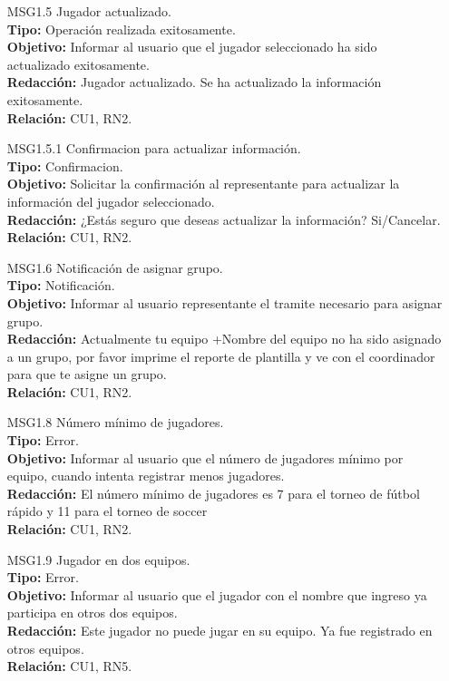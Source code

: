 \begin{itemize}
	 \item[MSG1.5] Jugador actualizado.\\
	 \textbf{Tipo:} Operación realizada exitosamente.\\
	 \textbf{Objetivo:} Informar al usuario que el jugador seleccionado ha sido actualizado exitosamente.\\
	 \textbf{Redacción:} Jugador actualizado. Se ha actualizado la información exitosamente. \\ 
	 \textbf{Relación:} CU1, RN2.
	 
	 \item[MSG1.5.1] Confirmacion para actualizar información.\\
	 \textbf{Tipo:} Confirmacion.\\
	 \textbf{Objetivo:} Solicitar la confirmación al representante para actualizar la información del jugador seleccionado.\\
	 \textbf{Redacción:} ¿Estás seguro que deseas actualizar la información? Si/Cancelar. \\
	 \textbf{Relación:} CU1, RN2.
	 
	 \item[MSG1.6] Notificación de asignar grupo.\\
	 \textbf{Tipo:} Notificación.\\
	 \textbf{Objetivo:} Informar al usuario representante el tramite necesario para asignar grupo.\\
	 \textbf{Redacción:} Actualmente tu equipo +Nombre del equipo no ha sido asignado a un grupo, por favor imprime el reporte de plantilla y ve con el coordinador para que te asigne un grupo. \\
	 \textbf{Relación:} CU1, RN2.
	 
	 \item[MSG1.8] Número mínimo de jugadores.\\
	 \textbf{Tipo:} Error.\\
	 \textbf{Objetivo:} Informar al usuario que el número de jugadores mínimo por equipo, cuando intenta registrar menos jugadores.\\
	 \textbf{Redacción:} El número mínimo de jugadores es 7 para el torneo de fútbol rápido y 11 para el torneo de soccer \\
	 \textbf{Relación:} CU1, RN2.
	 
	 \item[MSG1.9] Jugador en dos equipos.\\
	 \textbf{Tipo:} Error.\\
	 \textbf{Objetivo:} Informar al usuario que el jugador con el nombre que ingreso ya participa en otros dos equipos.\\
	 \textbf{Redacción:} Este jugador no puede jugar en su equipo. Ya fue registrado en otros equipos.\\	 
	 \textbf{Relación:} CU1, RN5.
	 

\end{itemize}
